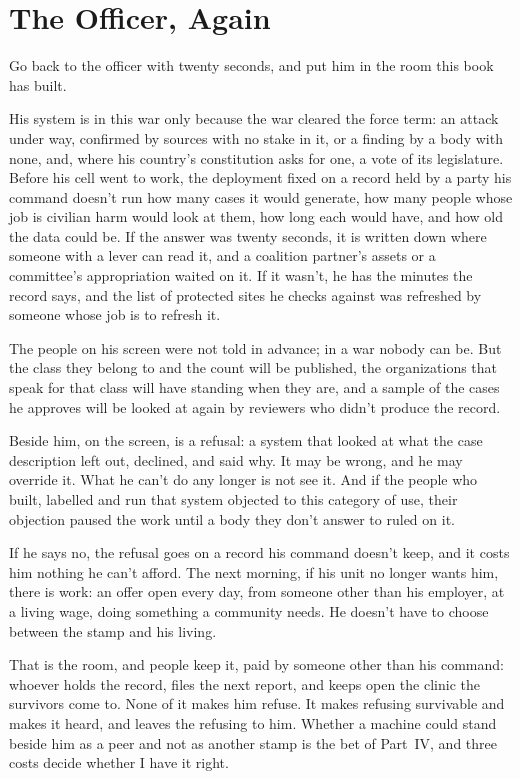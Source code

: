 \chapter{The Officer, Again}
\label{sec:33}
Go back to the officer with twenty seconds, and put him in the room this book has built.

His system is in this war only because the war cleared the force term: an attack under way, confirmed by sources with no stake in it, or a finding by a body with none, and, where his country's constitution asks for one, a vote of its legislature. Before his cell went to work, the deployment fixed on a record held by a party his command doesn't run how many cases it would generate, how many people whose job is civilian harm would look at them, how long each would have, and how old the data could be. If the answer was twenty seconds, it is written down where someone with a lever can read it, and a coalition partner's assets or a committee's appropriation waited on it. If it wasn't, he has the minutes the record says, and the list of protected sites he checks against was refreshed by someone whose job is to refresh it.

The people on his screen were not told in advance; in a war nobody can be. But the class they belong to and the count will be published, the organizations that speak for that class will have standing when they are, and a sample of the cases he approves will be looked at again by reviewers who didn't produce the record.

Beside him, on the screen, is a refusal: a system that looked at what the case description left out, declined, and said why. It may be wrong, and he may override it. What he can't do any longer is not see it. And if the people who built, labelled and run that system objected to this category of use, their objection paused the work until a body they don't answer to ruled on it.

If he says no, the refusal goes on a record his command doesn't keep, and it costs him nothing he can't afford. The next morning, if his unit no longer wants him, there is work: an offer open every day, from someone other than his employer, at a living wage, doing something a community needs. He doesn't have to choose between the stamp and his living.

That is the room, and people keep it, paid by someone other than his command: whoever holds the record, files the next report, and keeps open the clinic the survivors come to. None of it makes him refuse. It makes refusing survivable and makes it heard, and leaves the refusing to him. Whether a machine could stand beside him as a peer and not as another stamp is the bet of Part~IV, and three costs decide whether I have it right.

